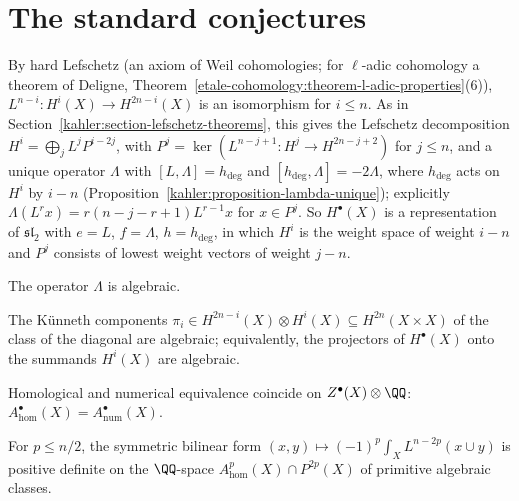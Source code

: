 \section{The standard conjectures}\label{absolute-hodge:section-conjectures}

By hard Lefschetz (an axiom of Weil cohomologies; for $\ell$-adic cohomology a theorem of Deligne, Theorem~\ref{etale-cohomology:theorem-l-adic-properties}(6)), $L^{n-i} \colon H^i(X) \to H^{2n-i}(X)$ is an
isomorphism for $i \leq n$. As in Section~\ref{kahler:section-lefschetz-theorems}, this gives the Lefschetz decomposition $H^i = \bigoplus_jL^jP^{i-2j}$, with $P^j = \ker(L^{n-j+1} \colon H^j \to H^{2n-j+2})$ for $j \leq n$, and a unique
operator $\Lambda$ with $[L, \Lambda] = h_{\deg}$ and $[h_{\deg}, \Lambda] = -2\Lambda$, where $h_{\deg}$ acts on $H^i$ by $i - n$ (Proposition~\ref{kahler:proposition-lambda-unique}); explicitly
$\Lambda(L^rx) = r(n - j - r + 1)L^{r-1}x$ for $x \in P^j$. So $H^\bullet(X)$ is a representation of $\mathfrak{sl}_2$ with $e = L$, $f = \Lambda$, $h = h_{\deg}$, in which $H^i$ is the weight space of weight $i - n$ and
$P^j$ consists of lowest weight vectors of weight $j - n$.

\begin{conjecture}\label{absolute-hodge:conjecture-b}
The operator $\Lambda$ is algebraic.
\end{conjecture}

\begin{conjecture}\label{absolute-hodge:conjecture-c}
The K\"unneth components $\pi_i \in H^{2n-i}(X) \otimes H^i(X) \subseteq H^{2n}(X \times X)$ of the class of the diagonal are algebraic; equivalently, the projectors of $H^\bullet(X)$ onto the summands $H^i(X)$
are algebraic.
\end{conjecture}

\begin{conjecture}\label{absolute-hodge:conjecture-d}
Homological and numerical equivalence coincide on $Z^\bullet(X) \otimes \QQ$: $A^\bullet_{\mathrm{hom}}(X) = A^\bullet_{\mathrm{num}}(X)$.
\end{conjecture}

\begin{conjecture}\label{absolute-hodge:conjecture-hdg}
For $p \leq n/2$, the symmetric bilinear form $(x, y) \mapsto (-1)^p\int_XL^{n-2p}(x \cup y)$ is positive definite on the $\QQ$-space $A^p_{\mathrm{hom}}(X) \cap P^{2p}(X)$ of primitive algebraic classes.
\end{conjecture}

